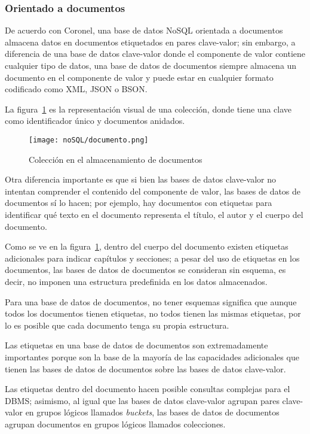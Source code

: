 \subsubsection{Orientado a documentos}
De acuerdo con Coronel\cite{coronel_database_nodate}, una base de datos NoSQL orientada a documentos almacena datos en documentos etiquetados en pares clave-valor; sin embargo, a diferencia de una base de datos clave-valor donde el componente de valor contiene cualquier tipo de datos, una base de datos de documentos siempre almacena un documento en el componente de valor y puede estar en cualquier formato codificado como XML, JSON o BSON.


La figura~\ref{img:documentos-documento} es la representación visual de una colección, donde tiene una clave como identificador único y documentos anidados.

\begin{figure}[H]
    \centering
    \texttt{[image: noSQL/documento.png]}
    \caption{Colección en el almacenamiento de documentos}
    \label{img:documentos-documento}
\end{figure}
Otra diferencia importante es que si bien las bases de datos clave-valor no intentan comprender el contenido del componente de valor, las bases de datos de documentos sí lo hacen; por ejemplo, hay documentos con etiquetas para identificar qué texto en el documento representa el título, el autor y el cuerpo del documento.


Como se ve en la figura~\ref{img:documentos-documento}, dentro del cuerpo del documento existen etiquetas adicionales para indicar capítulos y secciones; a pesar del uso de etiquetas en los documentos, las bases de datos de documentos se consideran sin esquema, es decir, no imponen una estructura predefinida en los datos almacenados.


Para una base de datos de documentos, no tener esquemas significa que aunque todos los documentos tienen etiquetas, no todos tienen las mismas etiquetas, por lo es posible que cada documento tenga su propia estructura.


Las etiquetas en una base de datos de documentos son extremadamente importantes porque son la base de la mayoría de las capacidades adicionales que tienen las bases de datos de documentos sobre las bases de datos clave-valor.


Las etiquetas dentro del documento hacen posible consultas complejas para el DBMS; asimismo, al igual que las bases de datos clave-valor agrupan pares clave-valor en grupos lógicos llamados \textit{buckets}, las bases de datos de documentos agrupan documentos en grupos lógicos llamados colecciones.


